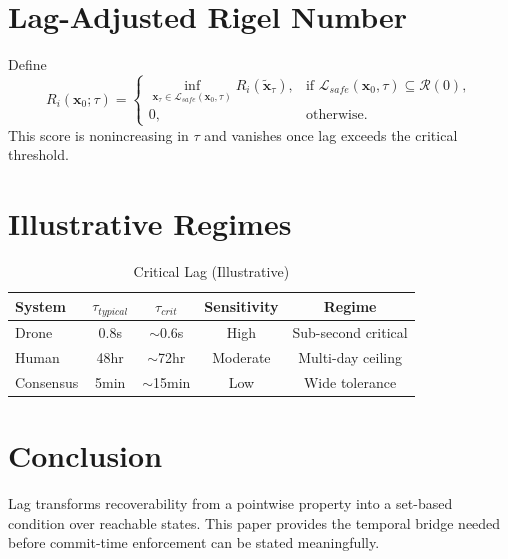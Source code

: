 \documentclass[letterpaper,10pt,conference]{ieeeconf}
\newcommand{\x}{\mathbf{x}}
\newcommand{\xt}{\tilde{\mathbf{x}}}
\newcommand{\Rset}{\mathcal{R}}
\newcommand{\Ri}{R_i}
\begin{document}
\section{Lag-Adjusted Rigel Number}
Define
\[
\Ri(\x_0;\tau)=
\begin{cases}
\inf_{\x_\tau\in\mathcal{L}_{safe}(\x_0,\tau)} \Ri(\xt_\tau), & \text{if }\mathcal{L}_{safe}(\x_0,\tau)\subseteq \Rset(0),\\
0, & \text{otherwise.}
\end{cases}
\]
This score is nonincreasing in $\tau$ and vanishes once lag exceeds the critical threshold.
\section{Illustrative Regimes}
\begin{table}[h]
\centering
\caption{Critical Lag (Illustrative)}
\begin{tabular}{lcccc}
\hline
System & $\tau_{typical}$ & $\tau_{crit}$ & Sensitivity & Regime \\
\hline
Drone & 0.8s & $\sim$0.6s & High & Sub-second critical \\
Human & 48hr & $\sim$72hr & Moderate & Multi-day ceiling \\
Consensus & 5min & $\sim$15min & Low & Wide tolerance \\
\hline
\end{tabular}
\end{table}
\section{Conclusion}
Lag transforms recoverability from a pointwise property into a set-based condition over reachable states. This paper provides the temporal bridge needed before commit-time enforcement can be stated meaningfully.
\end{document}

